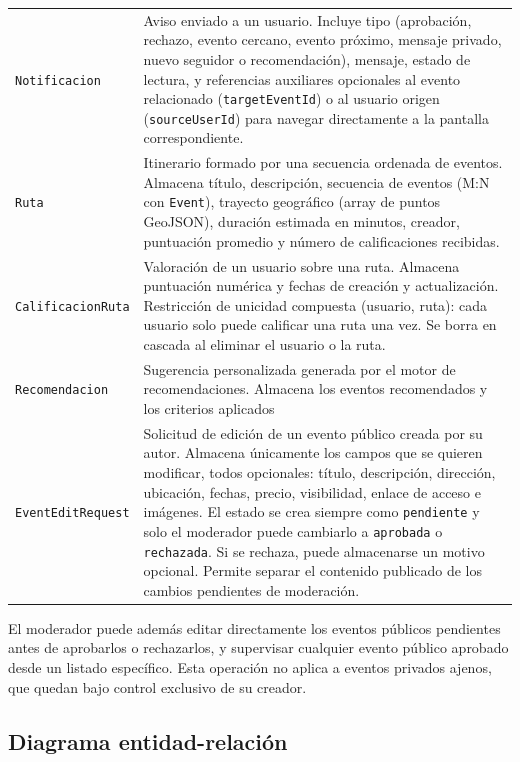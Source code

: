 {\begin{longtable}{@{}>{\raggedright\arraybackslash}p{} >{\raggedright\arraybackslash}p{}@{}}
\addlinespace
\texttt{Notificacion} & Aviso enviado a un usuario. Incluye tipo (aprobación, rechazo, evento cercano, evento próximo, mensaje privado, nuevo seguidor o recomendación), mensaje, estado de lectura, y referencias auxiliares opcionales al evento relacionado (\texttt{targetEventId}) o al usuario origen (\texttt{sourceUserId}) para navegar directamente a la pantalla correspondiente. \\
\addlinespace
\texttt{Ruta} & Itinerario formado por una secuencia ordenada de eventos. Almacena título, descripción, secuencia de eventos (M:N con \texttt{Event}), trayecto geográfico (array de puntos GeoJSON), duración estimada en minutos, creador, puntuación promedio y número de calificaciones recibidas. \\
\addlinespace
\texttt{CalificacionRuta} & Valoración de un usuario sobre una ruta. Almacena puntuación numérica y fechas de creación y actualización. Restricción de unicidad compuesta (usuario, ruta): cada usuario solo puede calificar una ruta una vez. Se borra en cascada al eliminar el usuario o la ruta. \\
\addlinespace
\texttt{Recomendacion} & Sugerencia personalizada generada por el motor de recomendaciones. Almacena los eventos recomendados y los criterios aplicados \\
\addlinespace
\texttt{EventEditRequest} & Solicitud de edición de un evento público creada por su autor. Almacena únicamente los campos que se quieren modificar, todos opcionales: título, descripción, dirección, ubicación, fechas, precio, visibilidad, enlace de acceso e imágenes. El estado se crea siempre como \texttt{pendiente} y solo el moderador puede cambiarlo a \texttt{aprobada} o \texttt{rechazada}. Si se rechaza, puede almacenarse un motivo opcional. Permite separar el contenido publicado de los cambios pendientes de moderación. \\
\end{longtable}
}

El moderador puede además editar directamente los eventos públicos pendientes antes de aprobarlos o rechazarlos, y supervisar cualquier evento público aprobado desde un listado específico. Esta operación no aplica a eventos privados ajenos, que quedan bajo control exclusivo de su creador.

\subsection{Diagrama entidad-relación}

